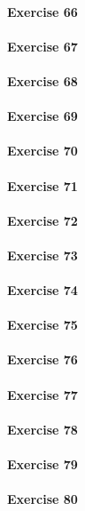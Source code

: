 \paragraph{Exercise 66}
\paragraph{Exercise 67}
\paragraph{Exercise 68}
\paragraph{Exercise 69}
\paragraph{Exercise 70}
\paragraph{Exercise 71}
\paragraph{Exercise 72}
\paragraph{Exercise 73}
\paragraph{Exercise 74}
\paragraph{Exercise 75}
\paragraph{Exercise 76}
\paragraph{Exercise 77}
\paragraph{Exercise 78}
\paragraph{Exercise 79}
\paragraph{Exercise 80}
